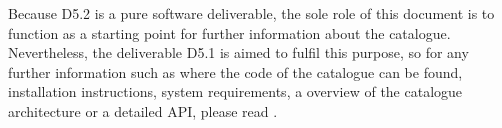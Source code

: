 \documentclass{fast_latex}
\begin{document}
Because D5.2 is a pure software deliverable, the sole role of this document is to function as a starting point for further information about the catalogue. Nevertheless, the deliverable D5.1 is aimed to fulfil this purpose, so for any further information such as where the code of the catalogue can be found, installation instructions, system requirements, a overview of the catalogue architecture or a detailed API, please read \cite{palaguita2010_usermanual}.



\clearpage


\end{document}
